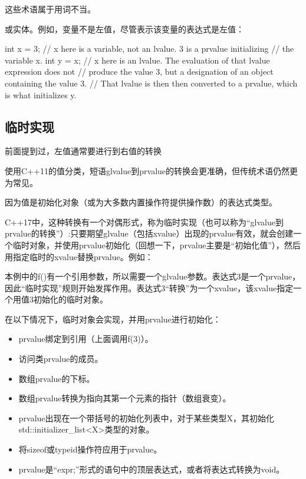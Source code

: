 \begin{notice}
这些术语属于用词不当。
\end{notice}

或实体。例如，变量不是左值，尽管表示该变量的表达式是左值：

\begin{cpp}
int x = 3; // x here is a variable, not an lvalue. 3 is a prvalue initializing
		  // the variable x.
int y = x; // x here is an lvalue. The evaluation of that lvalue expression does not
		  // produce the value 3, but a designation of an object containing the value 3.
		  // That lvalue is then then converted to a prvalue, which is what initializes y.
\end{cpp}

\subsection{临时实现}

前面提到过，左值通常要进行到右值的转换

\begin{notice}
使用C++11的值分类，短语glvalue到prvalue的转换会更准确，但传统术语仍然更为常见。
\end{notice}

因为值是初始化对象（或为大多数内置操作符提供操作数）的表达式类型。

C++17中，这种转换有一个对偶形式，称为临时实现（也可以称为“glvalue到prvalue的转换”）:只要期望glvalue（包括xvalue）出现的prvalue有效，就会创建一个临时对象，并使用prvalue初始化（回想一下，prvalue主要是“初始化值”），然后用指定临时的xvalue替换prvalue。例如：

本例中的f()有一个引用参数，所以需要一个glvalue参数。表达式3是一个prvalue，因此“临时实现”规则开始发挥作用。表达式3“转换”为一个xvalue，该xvalue指定一个用值3初始化的临时对象。

在以下情况下，临时对象会实现，并用prvalue进行初始化：

\begin{itemize}
\item 
prvalue绑定到引用（上面调用f(3)）。

\item 
访问类prvalue的成员。

\item 
数组prvalue的下标。

\item 
数组prvalue转换为指向其第一个元素的指针（数组衰变）。

\item 
prvalue出现在一个带括号的初始化列表中，对于某些类型X，其初始化std::initializer\_list<X>类型的对象。

\item 
将sizeof或typeid操作符应用于prvalue。

\item 
prvalue是“expr;”形式的语句中的顶层表达式，或者将表达式转换为void。
\end{itemize}

